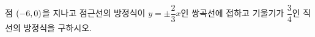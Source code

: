 점 $(-6{,}\mkern3mu\mathopen{}0)$을 지나고 점근선의 방정식이 $y=\pm\dfrac{2}{3}x$인 쌍곡선에 접하고 기울기가 $\dfrac{3}{4}$인 직선의 방정식을 구하시오.
